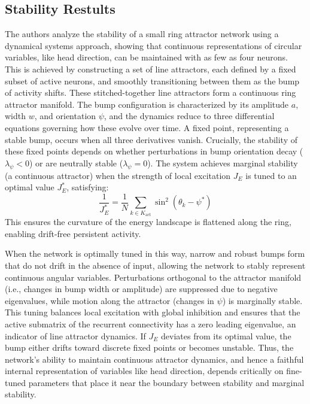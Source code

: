\documentclass[11pt,a4paper]{article}
\begin{document}
\subsection{Stability Restults}

The authors analyze the stability of a small ring attractor network using a dynamical systems approach, showing that continuous representations of circular variables, like head direction, can be maintained with as few as four neurons. This is achieved by constructing a set of line attractors, each defined by a fixed subset of active neurons, and smoothly transitioning between them as the bump of activity shifts. These stitched-together line attractors form a continuous ring attractor manifold. The bump configuration is characterized by its amplitude \( a \), width \( w \), and orientation \( \psi \), and the dynamics reduce to three differential equations governing how these evolve over time. A fixed point, representing a stable bump, occurs when all three derivatives vanish. Crucially, the stability of these fixed points depends on whether perturbations in bump orientation decay (\( \lambda_\psi < 0 \)) or are neutrally stable (\( \lambda_\psi = 0 \)). The system achieves marginal stability (a continuous attractor) when the strength of local excitation \( J_E \) is tuned to an optimal value \( J_E^* \), satisfying:
\[
\frac{1}{J_E^*} = \frac{1}{N} \sum_{k \in K_{\text{act}}} \sin^2(\theta_k - \psi^*)
\]
This ensures the curvature of the energy landscape is flattened along the ring, enabling drift-free persistent activity.

When the network is optimally tuned in this way, narrow and robust bumps form that do not drift in the absence of input, allowing the network to stably represent continuous angular variables. Perturbations orthogonal to the attractor manifold (i.e., changes in bump width or amplitude) are suppressed due to negative eigenvalues, while motion along the attractor (changes in \( \psi \)) is marginally stable. This tuning balances local excitation with global inhibition and ensures that the active submatrix of the recurrent connectivity has a zero leading eigenvalue, an indicator of line attractor dynamics. If \( J_E \) deviates from its optimal value, the bump either drifts toward discrete fixed points or becomes unstable. Thus, the network’s ability to maintain continuous attractor dynamics, and hence a faithful internal representation of variables like head direction, depends critically on fine-tuned parameters that place it near the boundary between stability and marginal stability.
\end{document}
